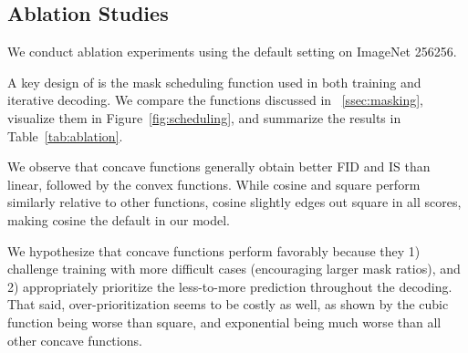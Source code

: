\subsection{Ablation Studies}
\setlength{\tabcolsep}{5pt}
\begin{table}[!t]
\small
    \centering
    {\small
    }
    \vspace{-.1cm}
    \caption{\textbf{Ablation results on the mask scheduling functions.} We report the best FID, IS, and Negative Log-Likelihood loss for each candidate scheduling function. }
    \label{tab:ablation}
\vspace{-3mm}
\end{table}
 \label{ssec:ablation}
We conduct ablation experiments using the default setting on ImageNet 256256.

A key design of \model is the mask scheduling function used in both training and iterative decoding. We compare the functions discussed in ~\ref{ssec:masking}, visualize them in Figure~\ref{fig:scheduling}, and summarize the results in Table~\ref{tab:ablation}.

We observe that concave functions generally obtain better FID and IS than linear, followed by the convex functions. While cosine and square perform similarly relative to other functions, cosine slightly edges out square in all scores, making cosine the default in our model.

We hypothesize that concave functions perform favorably because they 1) challenge training with more difficult cases (\ie encouraging larger mask ratios), and 2) appropriately prioritize the less-to-more prediction throughout the decoding.
That said, over-prioritization seems to be costly as well, as shown by the cubic function being worse than square, and exponential being much worse than all other concave functions.

